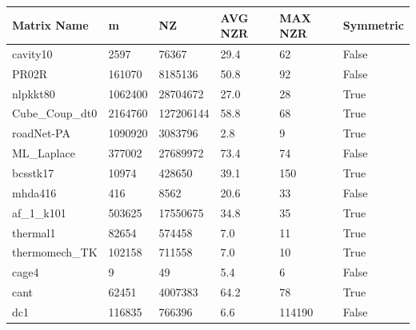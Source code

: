 \documentclass[12pt,oneside]{book} %
\begin{document}
\begin{table}[H]
    \centering
    \begin{tabular}{|l|l|l|l|l|l|}
        \hline
        \textbf{Matrix Name} & \textbf{m} & \textbf{NZ} & \textbf{AVG NZR} & \textbf{MAX NZR} & \textbf{Symmetric} \\ \hline
        cavity10             & 2597       & 76367       & 29.4             & 62               & False              \\ \hline
        PR02R                & 161070     & 8185136     & 50.8             & 92               & False              \\ \hline
        nlpkkt80             & 1062400    & 28704672    & 27.0             & 28               & True               \\ \hline
        Cube\_Coup\_dt0      & 2164760    & 127206144   & 58.8             & 68               & True               \\ \hline
        roadNet-PA           & 1090920    & 3083796     & 2.8              & 9                & True               \\ \hline
        ML\_Laplace          & 377002     & 27689972    & 73.4             & 74               & False              \\ \hline
        bcsstk17             & 10974      & 428650      & 39.1             & 150              & True               \\ \hline
        mhda416              & 416        & 8562        & 20.6             & 33               & False              \\ \hline
        af\_1\_k101          & 503625     & 17550675    & 34.8             & 35               & True               \\ \hline
        thermal1             & 82654      & 574458      & 7.0              & 11               & True               \\ \hline
        thermomech\_TK       & 102158     & 711558      & 7.0              & 10               & True               \\ \hline
        cage4                & 9          & 49          & 5.4              & 6                & False              \\ \hline
        cant                 & 62451      & 4007383     & 64.2             & 78               & True               \\ \hline
        dc1                  & 116835     & 766396      & 6.6              & 114190           & False              \\ \hline

\end{tabular}
\end{table}
\end{document}
